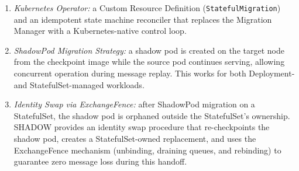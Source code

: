 \documentclass[conference]{IEEEtran}
\begin{document}
%
%
\begin{enumerate}
\item \textit{Kubernetes Operator:} a Custom Resource Definition
  (\texttt{StatefulMigration}) and an idempotent state machine reconciler that
  replaces the Migration Manager with a Kubernetes-native control loop.

\item \textit{ShadowPod Migration Strategy:} a shadow pod is created on the
  target node from the checkpoint image while the source pod continues serving,
  allowing concurrent operation during message replay. This works for
  both Deployment- and StatefulSet-managed workloads.

\item \textit{Identity Swap via ExchangeFence:} after ShadowPod migration
  on a StatefulSet, the shadow pod is orphaned outside the StatefulSet's
  ownership. SHADOW provides an identity swap procedure that re-checkpoints
  the shadow pod, creates a StatefulSet-owned replacement, and uses the
  ExchangeFence mechanism (unbinding, draining queues, and rebinding) to guarantee zero message loss during this handoff.
\end{enumerate}
\end{document}
